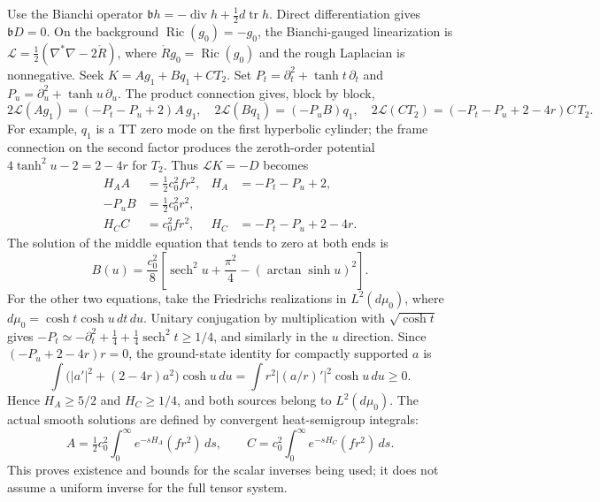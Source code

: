 \documentclass[a4paper,11pt]{article}
\numberwithin{equation}{section}
\theoremstyle{definition}
\newcommand{\Ric}{\operatorname{Ric}}
\newcommand{\tr}{\operatorname{tr}}
\begin{document}
Use the Bianchi operator $\mathfrak b h=-\operatorname{div}h+\tfrac12d\tr h$.
Direct differentiation gives $\mathfrak bD=0$. On the background $\Ric(g_0)=-g_0$,
the Bianchi-gauged linearization is
$\mathcal L=\tfrac12(\nabla^*\nabla-2\mathring R)$,
where $\mathring Rg_0=\Ric(g_0)$ and the rough Laplacian is nonnegative.
Seek $K=Ag_1+Bq_1+CT_2$. Set
$P_t=\partial_t^2+\tanh t\,\partial_t$ and
$P_u=\partial_u^2+\tanh u\,\partial_u$. The product connection gives, block by block,
\[
2\mathcal L(Ag_1)=(-P_t-P_u+2)A\,g_1,\quad
2\mathcal L(Bq_1)=(-P_uB)q_1,\quad
2\mathcal L(CT_2)=(-P_t-P_u+2-4r)C\,T_2.
\]
For example, $q_1$ is a TT zero mode on the first hyperbolic cylinder;
the frame connection on the second factor produces the zeroth-order potential
$4\tanh^2u-2=2-4r$ for $T_2$. Thus $\mathcal LK=-D$ becomes
\begin{equation}\label{eq:ED-three-equations}
\begin{aligned}
H_AA&=\tfrac12c_0^2fr^2,&H_A&=-P_t-P_u+2,\\
-P_uB&=\tfrac12c_0^2r^2,\\
H_CC&=c_0^2fr^2,&H_C&=-P_t-P_u+2-4r.
\end{aligned}
\end{equation}
The solution of the middle equation that tends to zero at both ends is
\begin{equation}\label{eq:ED-B}
B(u)=\frac{c_0^2}{8}
\left[\operatorname{sech}^2u+\frac{\pi^2}{4}
-(\arctan\sinh u)^2\right].
\end{equation}
For the other two equations, take the Friedrichs realizations in
$L^2(d\mu_0)$, where $d\mu_0=\cosh t\cosh u\,dt\,du$.
Unitary conjugation by multiplication with $\sqrt{\cosh t}$ gives
$-P_t\simeq-\partial_t^2+\tfrac14+\tfrac14\operatorname{sech}^2t\ge1/4$,
and similarly in the $u$ direction. Since $(-P_u+2-4r)r=0$,
the ground-state identity for compactly supported $a$ is
\begin{equation}\label{eq:ED-ground-state}
\int\bigl(|a'|^2+(2-4r)a^2\bigr)\cosh u\,du
=\int r^2|(a/r)'|^2\cosh u\,du\ge0.
\end{equation}
Hence $H_A\ge5/2$ and $H_C\ge1/4$, and both sources belong to $L^2(d\mu_0)$.
The actual smooth solutions are defined by convergent heat-semigroup integrals:
\[
A=\tfrac12c_0^2\int_0^\infty e^{-sH_A}(fr^2)\,ds,\qquad
C=c_0^2\int_0^\infty e^{-sH_C}(fr^2)\,ds.
\]
This proves existence and bounds for the scalar inverses being used; it does not assume a uniform inverse for the full tensor system.
\end{document}
